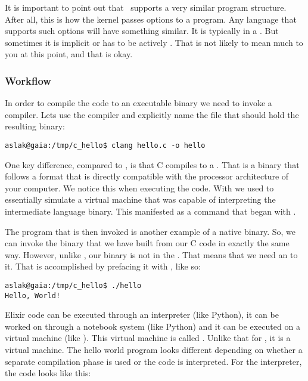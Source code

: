 It is important to point out that \csharp\ supports a very similar program structure. After all, this is how the kernel passes options to a program. Any language that supports such options will have something similar. It is typically in a . But sometimes it is implicit or has to be actively . That is not likely to mean much to you at this point, and that is okay.

\subsubsection{Workflow}

In order to compile the code to an executable binary we need to invoke a compiler. Lets use the  compiler and explicitly name the file that should hold the resulting binary:

\begin{verbatim}
aslak@gaia:/tmp/c_hello$ clang hello.c -o hello
\end{verbatim}

One key difference, compared to \csharp, is that C compiles to a . That is a binary that follows a format that is directly compatible with the processor architecture of your computer. We notice this when executing the code. With \csharp we used  to essentially simulate a virtual machine that was capable of interpreting the intermediate language binary. This manifested as a command that began with .

The  program that is then invoked is another example of a native binary. So, we can invoke the binary that we have built from our C code in exactly the same way. However, unlike , our binary is not in the . That means that we need an  to it. That is accomplished by prefacing it with , like so:

\begin{verbatim}
aslak@gaia:/tmp/c_hello$ ./hello
Hello, World!
\end{verbatim}


Elixir code can be executed through an interpreter (like Python), it can be worked on through a notebook system (like Python) and it can be executed on a virtual machine (like \csharp). This virtual machine is called . Unlike that for \csharp, it is a  virtual machine. The hello world program looks different depending on whether a separate compilation phase is used or the code is interpreted. For the interpreter, the code looks like this:




